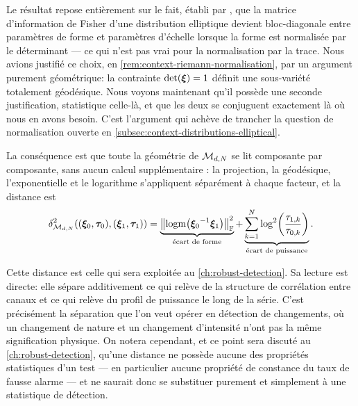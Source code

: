 \begin{remark}
\label{rem:context-geometry-decouplage}
  Le résultat repose entièrement sur le fait, établi par , que la matrice d'information de Fisher d'une distribution elliptique devient bloc-diagonale entre paramètres de forme et paramètres d'échelle lorsque la forme est normalisée par le déterminant --- ce qui n'est pas vrai pour la normalisation par la trace. Nous avions justifié ce choix, en \cref{rem:context-riemann-normalisation}, par un argument purement géométrique: la contrainte $\operatorname{\operatorname{det}}(\boldsymbol{\xi})=1$ définit une sous-variété totalement géodésique. Nous voyons maintenant qu'il possède une seconde justification, statistique celle-là, et que les deux se conjuguent exactement là où nous en avons besoin. C'est l'argument qui achève de trancher la question de normalisation ouverte en \cref{subsec:context-distributions-elliptical}.
\end{remark}

La conséquence est que toute la géométrie de $\mathcal{M}_{d,N}$ se lit composante par composante, sans aucun calcul supplémentaire : la projection, la géodésique, l'exponentielle et le logarithme s'appliquent séparément à chaque facteur, et la distance est
\begin{equation}
  \delta_{\mathcal{M}_{d,N}}^2\!\left((\boldsymbol{\xi}_0,\boldsymbol{\tau}_0),(\boldsymbol{\xi}_1,\boldsymbol{\tau}_1)\right)
  =
  \underbrace{\left\lVert\operatorname{\operatorname{logm}}\!\left({\boldsymbol{\xi}_0}^{-1}\boldsymbol{\xi}_1\right)\right\rVert_{\mathbb{F}}^2}_{\text{écart de forme}}
  +
  \underbrace{\sum_{k=1}^{N}\log^2\!\left(\frac{\tau_{1,k}}{\tau_{0,k}}\right)}_{\text{écart de puissance}}.
  \label{eq:context-geometry-distanceccg}
\end{equation}

\begin{remark}
  Cette distance est celle qui sera exploitée au \cref{ch:robust-detection}. Sa lecture est directe: elle sépare additivement ce qui relève de la structure de corrélation entre canaux et ce qui relève du profil de puissance le long de la série. C'est précisément la séparation que l'on veut opérer en détection de changements, où un changement de nature et un changement d'intensité n'ont pas la même signification physique. On notera cependant, et ce point sera discuté au \cref{ch:robust-detection}, qu'une distance ne possède aucune des propriétés statistiques d'un test --- en particulier aucune propriété de constance du taux de fausse alarme --- et ne saurait donc se substituer purement et simplement à une statistique de détection.
\end{remark}


